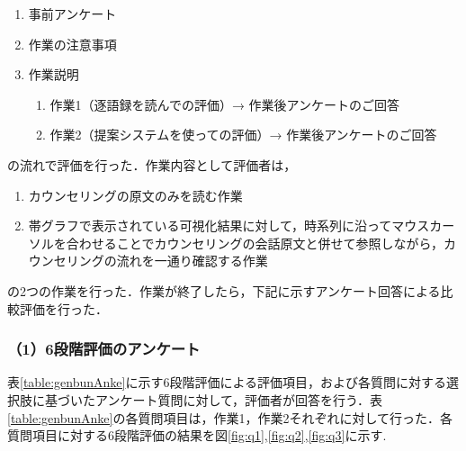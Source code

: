 \documentclass[shuuron]{kuee}
\begin{document}
\begin{enumerate}

  \item 事前アンケート
  \item 作業の注意事項
  \item 作業説明
  \begin{enumerate}

    \item 作業1（逐語録を読んでの評価）→ 作業後アンケートのご回答
    \item 作業2（提案システムを使っての評価）→ 作業後アンケートのご回答
  \end{enumerate}
\end{enumerate}
の流れで評価を行った．作業内容として評価者は，
\begin{enumerate}

  \item カウンセリングの原文のみを読む作業
  \item 帯グラフで表示されている可視化結果に対して，時系列に沿ってマウスカーソルを合わせることでカウンセリングの会話原文と併せて参照しながら，カウンセリングの流れを一通り確認する作業
\end{enumerate}
の2つの作業を行った．作業が終了したら，下記に示すアンケート回答による比較評価を行った．





\subsubsection{（1）6段階評価のアンケート}

表\ref{table:genbunAnke}に示す6段階評価による評価項目，および各質問に対する選択肢に基づいたアンケート質問に対して，評価者が回答を行う．表\ref{table:genbunAnke}の各質問項目は，作業1，作業2それぞれに対して行った．各質問項目に対する6段階評価の結果を図\ref{fig:q1},\ref{fig:q2},\ref{fig:q3}に示す.
\end{document}

